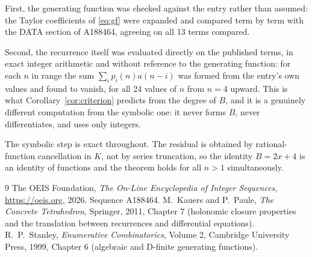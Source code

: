 \documentclass[11pt,a4paper]{article}
\theoremstyle{plain}
\theoremstyle{definition}
\begin{document}
First, the generating function was checked against the entry rather than assumed: the
Taylor coefficients of \eqref{eq:gf} were expanded and compared term by term with the DATA
section of A188464, agreeing on all 13 terms compared.

Second, the recurrence itself was evaluated directly on the published terms, in exact
integer arithmetic and without reference to the generating function: for each $n$ in range
the sum $\sum_{i}p_{i}(n)a(n-i)$ was formed from the entry's own values and found to
vanish, for all 24 values of $n$ from $n=4$ upward. This is what
Corollary~\ref{cor:criterion} predicts from the degree of $B$, and it is a genuinely
different computation from the symbolic one: it never forms $B$, never differentiates, and
uses only integers.

The symbolic step is exact throughout. The residual is obtained by rational-function
cancellation in $K$, not by series truncation, so the identity $B=2 x + 4$ is an
identity of functions and the theorem holds for all $n>1$ simultaneously.

\begin{thebibliography}{9}
 The OEIS Foundation, \emph{The On-Line Encyclopedia of Integer Sequences},
\url{https://oeis.org}, 2026. Sequence A188464.
 M.~Kauers and P.~Paule, \emph{The Concrete Tetrahedron}, Springer, 2011,
Chapter 7 (holonomic closure properties and the translation between recurrences and
differential equations).
 R.~P.~Stanley, \emph{Enumerative Combinatorics}, Volume 2, Cambridge
University Press, 1999, Chapter 6 (algebraic and D-finite generating functions).
\end{thebibliography}
\end{document}

